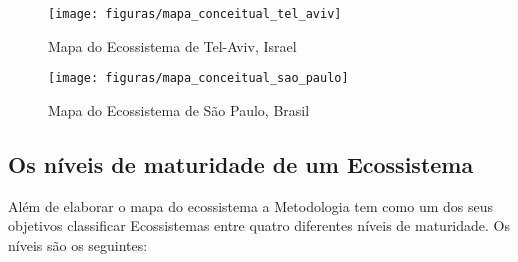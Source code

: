 \begin{figure}[!htbp]
\centering
\texttt{[image: figuras/mapa\_conceitual\_tel\_aviv]}
\caption{Mapa do Ecossistema de Tel-Aviv, Israel}
\label{Rotulo}
\end{figure}

\begin{figure}[!htbp]
\centering
\texttt{[image: figuras/mapa\_conceitual\_sao\_paulo]}
\caption{Mapa do Ecossistema de São Paulo, Brasil}
\label{Rotulo}
\end{figure}

\subsection{Os níveis de maturidade de um Ecossistema}
\label{subsection:niveis_de_maturidade_de_um_ecossistema}

Além de elaborar o mapa do ecossistema a Metodologia tem como um dos seus objetivos classificar Ecossistemas entre quatro diferentes níveis de maturidade. Os níveis são os seguintes:

